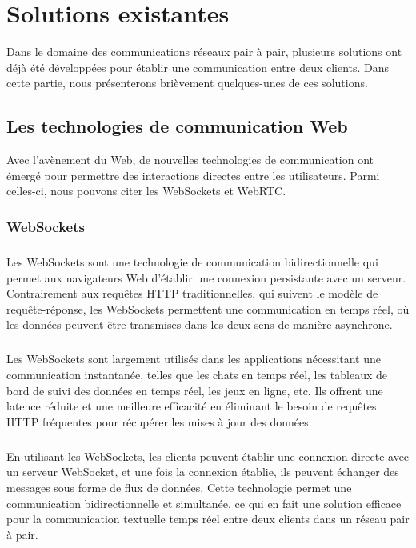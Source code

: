 \chapter{Solutions existantes}

Dans le domaine des communications réseaux pair à pair, plusieurs solutions ont déjà été développées pour établir une communication entre deux clients. 
Dans cette partie, nous présenterons brièvement quelques-unes de ces solutions.

\section{Les technologies de communication Web}

Avec l'avènement du Web, de nouvelles technologies de communication ont émergé pour permettre des interactions directes entre les utilisateurs. Parmi celles-ci, nous pouvons citer les WebSockets et WebRTC.

\subsection{WebSockets}

\paragraph{}
Les WebSockets sont une technologie de communication bidirectionnelle qui permet aux navigateurs Web d'établir une connexion persistante avec un serveur. Contrairement aux requêtes HTTP traditionnelles, 
qui suivent le modèle de requête-réponse, les WebSockets permettent une communication en temps réel, où les données peuvent être transmises dans les deux sens de manière asynchrone.

\paragraph{}
Les WebSockets sont largement utilisés dans les applications nécessitant une communication instantanée, telles que les chats en temps réel, les tableaux de bord de suivi des données en temps réel, 
les jeux en ligne, etc. Ils offrent une latence réduite et une meilleure efficacité en éliminant le besoin de requêtes HTTP fréquentes pour récupérer les mises à jour des données.

\newpage

\paragraph{}
En utilisant les WebSockets, les clients peuvent établir une connexion directe avec un serveur WebSocket, et une fois la connexion établie, ils peuvent échanger des messages sous forme de flux de données. 
Cette technologie permet une communication bidirectionnelle et simultanée, ce qui en fait une solution efficace pour la communication textuelle temps réel entre deux clients dans un réseau pair à pair.


